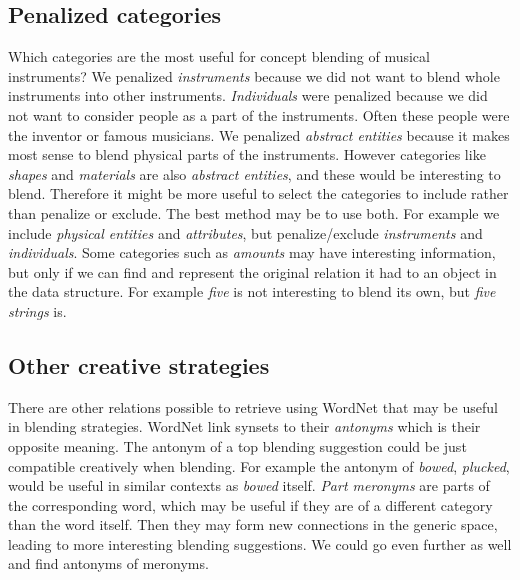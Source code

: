 


\subsection{Penalized categories}
Which categories are the most useful for concept blending of musical instruments? We penalized \emph{instruments} because we did not want to blend whole instruments into other instruments. \emph{Individuals} were penalized because we did not want to consider people as a part of the instruments. Often these people were the inventor or famous musicians. We penalized \emph{abstract entities} because it makes most sense to blend physical parts of the instruments. However categories like \emph{shapes} and \emph{materials} are also \emph{abstract entities}, and these would be interesting to blend. Therefore it might be more useful to select the categories to include rather than penalize or exclude. The best method may be to use both. For example we include \emph{physical entities} and \emph{attributes}, but penalize/exclude \emph{instruments} and \emph{individuals}. Some categories such as \emph{amounts} may have interesting information, but only if we can find and represent the original relation it had to an object in the data structure. For example \emph{five} is not interesting to blend its own, but \emph{five strings} is.


\subsection{Other creative strategies}
There are other relations possible to retrieve using WordNet that may be useful in blending strategies. WordNet link synsets to their \emph{antonyms} which is their opposite meaning. The antonym of a top blending suggestion could be just compatible creatively when blending. For example the antonym of \emph{bowed}, \emph{plucked}, would be useful in similar contexts as \emph{bowed} itself. \emph{Part meronyms} are parts of the corresponding word, which may be useful if they are of a different category than the word itself. Then they may form new connections in the generic space, leading to more interesting blending suggestions. We could go even further as well and find antonyms of meronyms.

